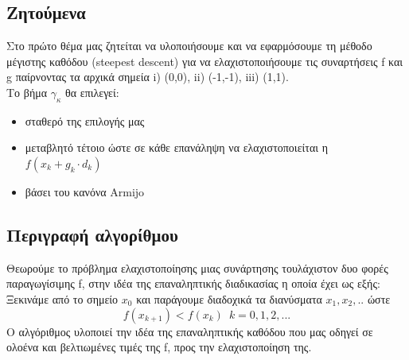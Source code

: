 \documentclass{article}
\begin{document}
\subsection*{Ζητούμενα}
Στο πρώτο θέμα μας ζητείται να υλοποιήσουμε και να εφαρμόσουμε τη μέθοδο μέγιστης καθόδου (steepest descent) για να ελαχιστοποιήσουμε τις συναρτήσεις f και g παίρνοντας τα αρχικά σημεία i) (0,0), ii) (-1,-1), iii) (1,1).\\Το βήμα $γ_κ$ θα επιλεγεί:
\begin{itemize}
\item σταθερό της επιλογής μας
\item μεταβλητό τέτοιο ώστε σε κάθε επανάληψη να ελαχιστοποιείται η $f(x_k+g_k \cdot d_k )$ 
\item  βάσει του κανόνα Armijo
\end{itemize}
\subsection*{Περιγραφή αλγορίθμου}
Θεωρούμε το πρόβλημα ελαχιστοποίησης μιας συνάρτησης τουλάχιστον δυο φορές παραγωγίσιμης f, στην ιδέα της επαναληπτικής διαδικασίας η οποία έχει ως εξής:\\
Ξεκινάμε από το σημείο $x_0$ και παράγουμε διαδοχικά τα διανύσματα $x_1,x_2,..$ ώστε
\begin{equation*}
f(x_{k+1}) < f(x_k) \enspace k=0,1,2,...
\end{equation*} 
Ο αλγόριθμος υλοποιεί την ιδέα της επαναληπτικής καθόδου που μας οδηγεί σε ολοένα και βελτιωμένες τιμές της f, προς την ελαχιστοποίηση της.
\end{document}
